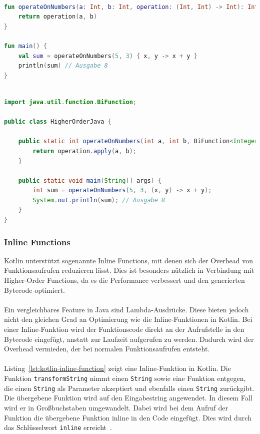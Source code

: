 \documentclass[11pt]{article}
\begin{document}
    \begin{lstlisting}[language=Kotlin, caption={HigherOrderKotlin.kt}, label={lst:kotlin-higher-order-function}]

fun operateOnNumbers(a: Int, b: Int, operation: (Int, Int) -> Int): Int {
    return operation(a, b)
}

fun main() {
    val sum = operateOnNumbers(5, 3) { x, y -> x + y }
    println(sum) // Ausgabe 8
}
    \end{lstlisting}

    \begin{lstlisting}[language=Java, caption={HigherOrderJava.java}, label={lst:java-higher-order-function}]

import java.util.function.BiFunction;

public class HigherOrderJava {

    public static int operateOnNumbers(int a, int b, BiFunction<Integer, Integer, Integer> operation) {
        return operation.apply(a, b);
    }

    public static void main(String[] args) {
        int sum = operateOnNumbers(5, 3, (x, y) -> x + y);
        System.out.println(sum); // Ausgabe 8
    }
}
    \end{lstlisting}

    \subsubsection{Inline Functions}
    Kotlin unterstützt sogenannte Inline Functions, mit denen sich der Overhead von Funktionsaufrufen reduzieren lässt.
    Dies ist besonders nützlich in Verbindung mit Higher-Order Functions, da es die Performance verbessert und den generierten Bytecode optimiert.\\
    \\
    Ein vergleichbares Feature in Java sind Lambda-Ausdrücke.
    Diese bieten jedoch nicht den gleichen Grad an Optimierung wie die Inline-Funktionen in Kotlin.
    Bei einer Inline-Funktion wird der Funktionscode direkt an der Aufrufstelle in den Bytecode eingefügt, anstatt zur Laufzeit aufgerufen zu werden.
    Dadurch wird der Overhead vermieden, der bei normalen Funktionsaufrufen entsteht.\\
    \\
    Listing~\ref{lst:kotlin-inline-function} zeigt eine Inline-Funktion in Kotlin.
    Die Funktion \texttt{transformString} nimmt einen \texttt{String} sowie eine Funktion entgegen, die einen \texttt{String} als Parameter akzeptiert und ebenfalls einen \texttt{String} zurückgibt.
    Die übergebene Funktion wird auf den Eingabestring angewendet.
    In diesem Fall wird er in Großbuchstaben umgewandelt.
    Dabei wird bei dem Aufruf der Funktion die übergebene Funktion inline in den Code eingefügt.
    Dies wird durch das Schlüsselwort \texttt{inline} erreicht~\cite{kotlin-inline}.\\
    \\
\end{document}
